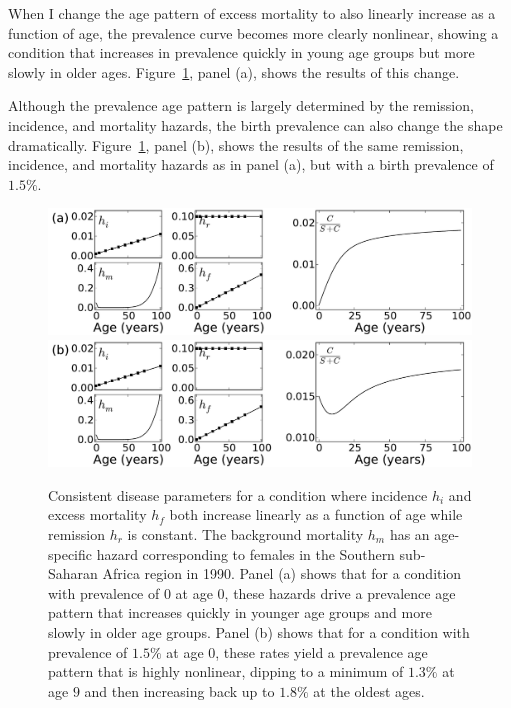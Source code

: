 When I change the age pattern of excess mortality to also linearly
increase as a function of age, the prevalence curve
becomes more clearly nonlinear, showing a condition that increases in
prevalence quickly in young age groups but more slowly in older
ages. Figure~\ref{forward-sim-ex2}, panel (a), shows the results
of this change.

Although the prevalence age pattern is largely determined by the
remission, incidence, and mortality hazards, the birth prevalence can
also change the shape
dramatically. Figure~\ref{forward-sim-ex2}, panel (b),
shows the results of the same remission, incidence, and mortality
hazards as in panel (a), but with a birth prevalence of $1.5\%$.

\begin{figure}[htb]
\begin{center}
\includegraphics[width=\textwidth]{more-excess-mortality.pdf}
\includegraphics[width=\textwidth]{birth-prevalence.pdf}
\caption[Consistent disease parameters for a condition with
  excess mortality $h_f$ increasing linearly as a
  function of age.]{Consistent disease parameters for a condition where incidence
  $h_i$ and excess mortality $h_f$ both increase linearly as a
  function of age while remission $h_r$ is constant. The background
  mortality $h_m$ has an age-specific hazard corresponding to females in
  the Southern sub-Saharan Africa region in 1990. Panel (a) shows that for a condition
  with prevalence of $0$ at age $0$, these hazards drive a prevalence
  age pattern that increases quickly in younger age groups and
  more slowly in older age groups. Panel (b) shows that for a condition with prevalence of
  $1.5\%$ at age $0$, these rates yield a prevalence age pattern that is
  highly nonlinear, dipping to a minimum of $1.3\%$ at age $9$ and then
  increasing back up to $1.8\%$ at the oldest ages.
}
\label{forward-sim-ex2}
\end{center}
\end{figure}


